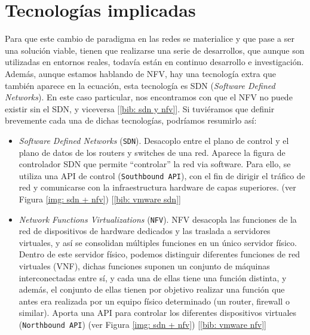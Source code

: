 \documentclass[a4paper, oneside, 12pt]{book}
\begin{document}
	
	\pagebreak
	
	\section{Tecnologías implicadas}
	\noindent Para que este cambio de paradigma en las redes se materialice y que pase a ser una solución viable, tienen que realizarse una serie de desarrollos, que aunque son utilizadas en entornos reales, todavía están en continuo desarrollo e investigación. \\
	
	\noindent Además, aunque estamos hablando de NFV, hay una tecnología extra que también aparece en la ecuación, esta tecnología es SDN (\textit{Software Defined Networks}). En este caso particular, nos encontramos con que el NFV no puede existir sin el SDN, y viceversa [\ref{bib: sdn y nfv}]. Si tuviéramos que definir brevemente cada una de dichas tecnologías, podríamos resumirlo así:
	\begin{itemize}
		\item \textit{Software Defined Networks} (\texttt{SDN}). Desacoplo entre el plano de control y el plano de datos de los routers y switches de una red. Aparece la figura de controlador SDN que permite ``controlar'' la red via software. Para ello, se utiliza una API de control (\texttt{Southbound API}), con el fin de dirigir el tráfico de red y comunicarse con la infraestructura hardware de capas superiores. (ver Figura \ref{img: sdn + nfv}) [\ref{bib: vmware sdn}]
		 
		\item \textit{Network Functions Virtualizations} (\texttt{NFV}). NFV desacopla las funciones de la red de dispositivos de hardware dedicados y las traslada a servidores virtuales, y así se consolidan múltiples funciones en un único servidor físico. Dentro de este servidor físico, podemos distinguir diferentes funciones de red virtuales (VNF), dichas funciones suponen un conjunto de máquinas interconectadas entre sí, y cada una de ellas tiene una función distinta, y además, el conjunto de ellas tienen por objetivo realizar una función que antes era realizada por un equipo físico determinado (un router, firewall o similar). Aporta una API para controlar los diferentes dispositivos virtuales (\texttt{Northbound API}) (ver Figura \ref{img: sdn + nfv}) [\ref{bib: vmware nfv}]
	\end{itemize}
\end{document}
